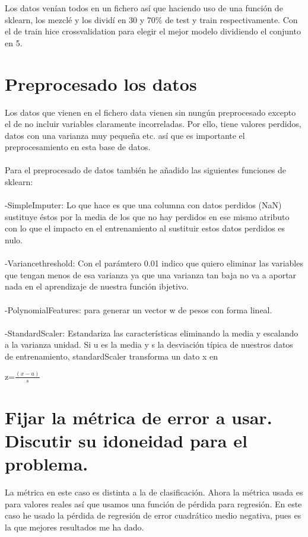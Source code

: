 \documentclass[12pt]{article}
\begin{document}
Los datos venían todos en un fichero así que haciendo uso de una función de sklearn, los mezclé y los dividí en 30 y 70$\%$ de test y train respectivamente. Con el de train hice crossvalidation para elegir el mejor modelo dividiendo el conjunto en 5.

\section{Preprocesado los datos}
Los datos que vienen en el fichero data vienen sin nungún preprocesado excepto el de no incluir variables claramente incorreladas. Por ello, tiene valores perdidos, datos con una varianza muy pequeña etc. así que es importante el preprocesamiento en esta base de datos. \\\\
Para el preprocesado de datos también he añadido las siguientes funciones de sklearn:\\\\
-SimpleImputer: Lo que hace es que una columna con datos perdidos (NaN) sustituye éstos por la media de los que no hay perdidos en ese mismo atributo con lo que el impacto en el entrenamiento al sustituir estos datos perdidos es nulo.\\\\
-Variancethreshold: Con el parámtero 0.01 indico que quiero eliminar las variables que tengan menos de esa varianza ya que una varianza tan baja no va a aportar nada en el aprendizaje de nuestra función ibjetivo.\\\\
-PolynomialFeatures: para generar un vector w de pesos con forma lineal.\\\\
-StandardScaler: Estandariza las características eliminando la media y escalando a la varianza unidad. Si u es la media y s la desviación típica de nuestros datos de entrenamiento, standardScaler transforma un dato x en
\begin{center}
z=$\frac{(x-u)}{s}$
\end{center}

\section{Fijar la métrica de error a usar. Discutir su idoneidad para el problema.}
La métrica en este caso es distinta a la de clasificación. Ahora la métrica usada es para valores reales así que usamos una función de pérdida para regresión. En este caso he usado la pérdida de regresión de error cuadrático medio negativa, pues es la que mejores resultados me ha dado.
\end{document}
